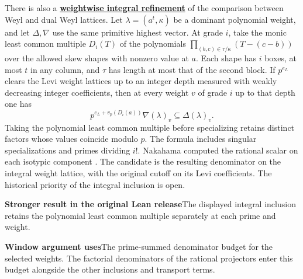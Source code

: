 \documentclass[11pt,a4paper]{article}
\newcommand{\rhscopelabel}[2]{%
  {\setlength{\fboxsep}{2pt}\colorbox{#1}{%
    \small\sffamily\bfseries\color{PageInk}#2}}}
\newcommand{\rhrange}[3][Stronger result in the original Lean release]{%
  \par\addvspace{.45\baselineskip}\Needspace{4\baselineskip}%
  \begingroup\setlength{\leftskip}{.65em}\setlength{\parindent}{0pt}%
  \noindent\rhscopelabel{TraceTint}{#1}\enspace#2\par
  \nobreak\smallskip
  \noindent\rhscopelabel{FieldTint}{Window argument uses}\enspace#3\par
  \endgroup\addvspace{.45\baselineskip}}
\begin{document}
There is also a \textbf{\hyperlink{candidate.integral-weyl-content}{weightwise
integral refinement}} of the comparison between Weyl and dual Weyl
lattices. Let \(\lambda=(a^t,\kappa)\) be a dominant polynomial
weight, and let \(\Delta,\nabla\) use the same primitive highest
vector. At grade \(i\), take the monic least common multiple
\(D_i(T)\) of the polynomials
\(\prod_{(b,c)\in\tau/\kappa}(T-(c-b))\) over the allowed skew
shapes with nonzero value at \(a\). Each shape has \(i\) boxes,
at most \(t\) in any column, and \(\tau\) has length at most
that of the second block. If \(p^{e_L}\) clears the Levi weight
lattices up to an integer depth measured with weakly decreasing
integer coefficients, then at every weight \(v\) of grade \(i\) up to
that depth one has
\[
  p^{e_L+v_p(D_i(a))}\nabla(\lambda)_v\subseteq\Delta(\lambda)_v .
\]
Taking the polynomial least common multiple before specializing
retains distinct factors whose values coincide modulo \(p\).
The formula includes singular specializations and primes dividing
\(i!\). Nakahama computed the rational scalar on each isotypic
component \cite[Theorem~1.2]{nakahama-norms}. The candidate is
the resulting denominator on the integral weight lattice, with
the original cutoff on its Levi coefficients. The historical priority
of the integral inclusion is open.
\rhrange{The displayed integral inclusion retains the polynomial
least common multiple separately at each prime and weight.}
{The prime-summed denominator budget for the selected weights.
The factorial denominators of the rational projectors enter this
budget alongside the other inclusions and transport terms.}
\end{document}
